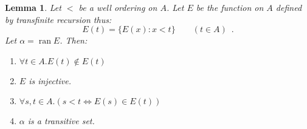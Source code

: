 \documentclass{article}
\newtheorem{lemma}[axiom]{Lemma}
\theoremstyle{definition}
\newcommand{\ran}{\ensuremath{\operatorname{ran}}}
\begin{document}
    \begin{lemma}
        \label{lemma:epsilon_image}
        Let $<$ be a well ordering on $A$. Let $E$ be the function on $A$ defined by transfinite recursion
        thus:
        \[ E(t) = \{ E(x) : x < t \} \qquad (t \in A) \enspace . \]
        Let $\alpha = \ran E$. Then:
        \begin{enumerate}
            \item $\forall t \in A. E(t) \notin E(t)$
            \item $E$ is injective.
            \item $\forall s,t \in A. (s < t \Leftrightarrow E(s) \in E(t))$
            \item $\alpha$ is a transitive set.
        \end{enumerate}
    \end{lemma}
\end{document}
